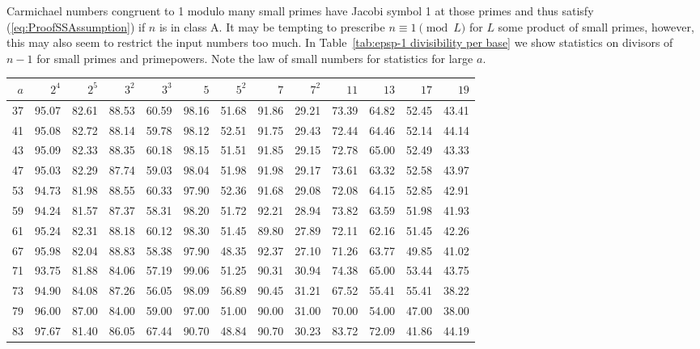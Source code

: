 \documentclass[runningheads]{amsart}
\begin{document}
Carmichael numbers congruent to 1 modulo many small primes have Jacobi symbol 1 at
those primes and thus satisfy
(\ref{eq:ProofSSAssumption})
if $n$ is in class A.
It may be tempting to prescribe
$n\equiv
1\pmod
L$ for $L$ some product of small primes,
however,
this may also seem to restrict the input numbers too much.
In
Table~\ref{tab:epsp-1
divisibility per
base}
we show statistics on divisors of $n-1$ for small primes and primepowers.
Note the law of small numbers for statistics for large $a$.

\begin{table}
\centering
\begin{tiny}
\begin{tabular}{r|r|r|r|r|r|r|r|r|r|r|r|r}
$a$
&
$2^4$
&
$2^5$
&
$3^2$
&
$3^3$
&
$5$
&
$5^2$
&
$7$
&
$7^2$
&
$11$
&
$13$
&
$17$
&
$19$
\\
\hline
37
 &
95.07
&
82.61
&
88.53
&
60.59
&
98.16
&
51.68
&
91.86
&
29.21
&
73.39
&
64.82
&
52.45
&
43.41
\\
41
 &
95.08
&
82.72
&
88.14
&
59.78
&
98.12
&
52.51
&
91.75
&
29.43
&
72.44
&
64.46
&
52.14
&
44.14
\\
43
 &
95.09
&
82.33
&
88.35
&
60.18
&
98.15
&
51.51
&
91.85
&
29.15
&
72.78
&
65.00
&
52.49
&
43.33
\\
47
 &
95.03
&
82.29
&
87.74
&
59.03
&
98.04
&
51.98
&
91.98
&
29.17
&
73.61
&
63.32
&
52.58
&
43.97
\\
53
 &
94.73
&
81.98
&
88.55
&
60.33
&
97.90
&
52.36
&
91.68
&
29.08
&
72.08
&
64.15
&
52.85
&
42.91
\\
59
 &
94.24
&
81.57
&
87.37
&
58.31
&
98.20
&
51.72
&
92.21
&
28.94
&
73.82
&
63.59
&
51.98
&
41.93
\\
61
 &
95.24
&
82.31
&
88.18
&
60.12
&
98.30
&
51.45
&
89.80
&
27.89
&
72.11
&
62.16
&
51.45
&
42.26
\\
67
 &
95.98
&
82.04
&
88.83
&
58.38
&
97.90
&
48.35
&
92.37
&
27.10
&
71.26
&
63.77
&
49.85
&
41.02
\\
71
 &
93.75
&
81.88
&
84.06
&
57.19
&
99.06
&
51.25
&
90.31
&
30.94
&
74.38
&
65.00
&
53.44
&
43.75
\\
73
 &
94.90
&
84.08
&
87.26
&
56.05
&
98.09
&
56.89
&
90.45
&
31.21
&
67.52
&
55.41
&
55.41
&
38.22
\\
79
 &
96.00
&
87.00
&
84.00
&
59.00
&
97.00
&
51.00
&
90.00
&
31.00
&
70.00
&
54.00
&
47.00
&
38.00
\\
83
 &
97.67
&
81.40
&
86.05
&
67.44
&
90.70
&
48.84
&
90.70
&
30.23
&
83.72
&
72.09
&
41.86
&
44.19
\\

\end{tabular}
\end{tiny}
\end{table}
\end{document}

